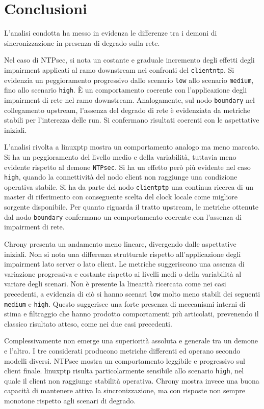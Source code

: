 \chapter{Conclusioni}
\label{cha:conclusioni}

L'analisi condotta ha messo in evidenza le differenze tra i demoni di sincronizzazione 
in presenza di degrado sulla rete.

Nel caso di NTPsec, si nota un costante e graduale incremento degli effetti 
degli impairment applicati al ramo downstream nei confronti del \texttt{clientntp}.
Si evidenzia un peggioramento progressivo dallo scenario \texttt{low} allo scenario
\texttt{medium}, fino allo scenario \texttt{high}.
È un comportamento coerente con l'applicazione degli impairment di rete nel ramo downstream.
Analogamente, sul nodo \texttt{boundary} nel collegamento upstream, l'assenza del degrado di rete
è evidenziata da metriche stabili per l'interezza delle run. Si confermano risultati coerenti
con le aspettative iniziali.

L'analisi rivolta a linuxptp mostra un comportamento analogo ma meno marcato.
Si ha un peggioramento del livello medio e della variabilità, 
tuttavia meno evidente rispetto al demone \texttt{NTPsec}. 
Si ha un effetto però più evidente nel caso \texttt{high}, quando la connettività 
del nodo client non raggiunge una condizione operativa stabile.
Si ha da parte del nodo \texttt{clientptp} una continua ricerca di un master di riferimento
con conseguente scelta del clock locale come migliore sorgente disponibile.
Per quanto riguarda il tratto upstream, le metriche ottenute dal nodo \texttt{boundary}
confermano un comportamento coerente con l'assenza di impairment di rete.

Chrony presenta un andamento meno lineare, divergendo dalle aspettative iniziali.
Non si nota una differenza strutturale rispetto all'applicazione degli impairment
lato server o lato client.
Le metriche suggeriscono una assenza di variazione progressiva e costante
 rispetto ai livelli medi o della variabilità al variare degli scenari. 
Non è presente la linearità ricercata come nei casi precedenti, a evidenzia di ciò
si hanno scenari \texttt{low} molto meno stabili dei seguenti \texttt{medium} e \texttt{high}.
Questo suggerisce una forte presenza di meccanismi interni di stima e filtraggio che hanno 
prodotto comportamenti più articolati, prevenendo il classico risultato atteso, 
come nei due casi precedenti.

Complessivamente non emerge una superiorità assoluta e generale tra un demone e l'altro.
I tre considerati producono metriche differenti ed operano secondo modelli diversi.
NTPsec mostra un comportamento leggibile e progressivo sul client finale.
linuxptp risulta particolarmente sensibile allo scenario
\texttt{high}, nel quale il client non raggiunge stabilità operativa. Chrony
mostra invece una buona capacità di mantenere attiva la sincronizzazione, ma con
risposte non sempre monotone rispetto agli scenari di degrado.

